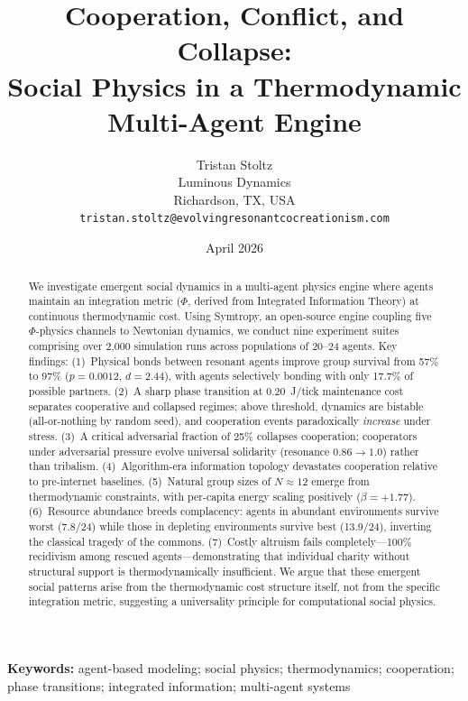 \documentclass[12pt,a4paper]{article}
\title{Cooperation, Conflict, and Collapse:\\Social Physics in a Thermodynamic Multi-Agent Engine}
\author{Tristan Stoltz\\
  Luminous Dynamics\\
  Richardson, TX, USA\\
  \texttt{tristan.stoltz@evolvingresonantcocreationism.com}
}
\date{April 2026}
\begin{document}
\maketitle

\begin{abstract}
We investigate emergent social dynamics in a multi-agent physics engine where agents maintain an integration metric ($\Phi$, derived from Integrated Information Theory) at continuous thermodynamic cost. Using Symtropy, an open-source engine coupling five $\Phi$-physics channels to Newtonian dynamics, we conduct nine experiment suites comprising over 2{,}000 simulation runs across populations of 20--24 agents. Key findings: (1)~Physical bonds between resonant agents improve group survival from 57\% to 97\% ($p=0.0012$, $d=2.44$), with agents selectively bonding with only 17.7\% of possible partners. (2)~A sharp phase transition at 0.20~J/tick maintenance cost separates cooperative and collapsed regimes; above threshold, dynamics are bistable (all-or-nothing by random seed), and cooperation events paradoxically \emph{increase} under stress. (3)~A critical adversarial fraction of 25\% collapses cooperation; cooperators under adversarial pressure evolve universal solidarity (resonance $0.86 \to 1.0$) rather than tribalism. (4)~Algorithm-era information topology devastates cooperation relative to pre-internet baselines. (5)~Natural group sizes of $N \approx 12$ emerge from thermodynamic constraints, with per-capita energy scaling positively ($\beta = +1.77$). (6)~Resource abundance breeds complacency: agents in abundant environments survive worst (7.8/24) while those in depleting environments survive best (13.9/24), inverting the classical tragedy of the commons. (7)~Costly altruism fails completely---100\% recidivism among rescued agents---demonstrating that individual charity without structural support is thermodynamically insufficient. We argue that these emergent social patterns arise from the thermodynamic cost structure itself, not from the specific integration metric, suggesting a universality principle for computational social physics.
\end{abstract}

\noindent\textbf{Keywords:} agent-based modeling; social physics; thermodynamics; cooperation; phase transitions; integrated information; multi-agent systems
\end{document}
